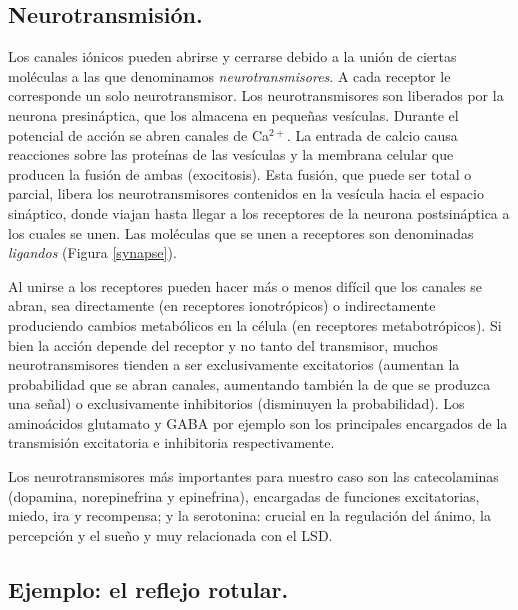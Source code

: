 \subsection{Neurotransmisión.}

Los canales iónicos pueden abrirse y cerrarse debido a la unión de ciertas moléculas a las que denominamos \textit{neurotransmisores}. A cada receptor le corresponde un solo neurotransmisor. Los neurotransmisores son liberados por la neurona presináptica, que los almacena en pequeñas vesículas. Durante el potencial de acción se abren canales de Ca$^{2+}$. La entrada de calcio causa reacciones sobre las proteínas de las vesículas y la membrana celular que producen la fusión de ambas (exocitosis). Esta fusión, que puede ser total o parcial, libera los neurotransmisores contenidos en la vesícula hacia el espacio sináptico, donde viajan hasta llegar a los receptores de la neurona postsináptica a los cuales se unen. Las moléculas que se unen a receptores son denominadas \textit{ligandos} (Figura \ref{synapse}).

Al unirse a los receptores pueden hacer más o menos difícil que los canales se abran, sea directamente (en receptores ionotrópicos) o indirectamente produciendo cambios metabólicos en la célula (en receptores metabotrópicos). Si bien la acción depende del receptor y no tanto del transmisor, muchos neurotransmisores tienden a ser exclusivamente excitatorios (aumentan la probabilidad que se abran canales, aumentando también la de que se produzca una señal) o exclusivamente inhibitorios (disminuyen la probabilidad). Los aminoácidos glutamato y GABA por ejemplo son los principales encargados de la transmisión excitatoria e inhibitoria respectivamente.

Los neurotransmisores más importantes para nuestro caso son las catecolaminas (dopamina, norepinefrina y epinefrina), encargadas de funciones excitatorias, miedo, ira y recompensa; y la serotonina: crucial en la regulación del ánimo, la percepción y el sueño y muy relacionada con el LSD.

\subsection{Ejemplo: el reflejo rotular.}

